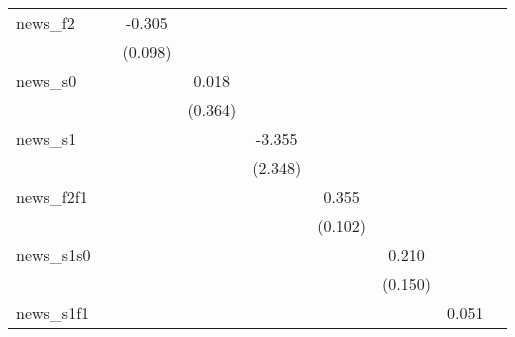 {\begin{tabular}{l*{8}{c}}
\addlinespace
news\_f2     &                     &      -0.305\sym{***}&                     &                     &                     &                     &                     &                     \\
            &                     &     (0.098)         &                     &                     &                     &                     &                     &                     \\
\addlinespace
news\_s0     &                     &                     &       0.018         &                     &                     &                     &                     &                     \\
            &                     &                     &     (0.364)         &                     &                     &                     &                     &                     \\
\addlinespace
news\_s1     &                     &                     &                     &      -3.355         &                     &                     &                     &                     \\
            &                     &                     &                     &     (2.348)         &                     &                     &                     &                     \\
\addlinespace
news\_f2f1   &                     &                     &                     &                     &       0.355\sym{***}&                     &                     &                     \\
            &                     &                     &                     &                     &     (0.102)         &                     &                     &                     \\
\addlinespace
news\_s1s0   &                     &                     &                     &                     &                     &       0.210         &                     &                     \\
            &                     &                     &                     &                     &                     &     (0.150)         &                     &                     \\
\addlinespace
news\_s1f1   &                     &                     &                     &                     &                     &                     &       0.051         &                     \\

\end{tabular}}
